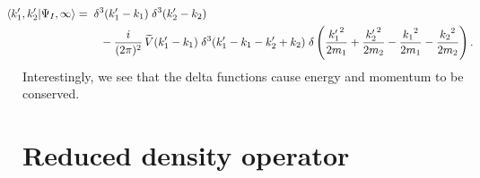 \documentclass[11pt]{article}
\newcommand{\braket}[2]{\left\langle#1|#2\right\rangle}
\theoremstyle{theorem}
\theoremstyle{remark}
\theoremstyle{step}
\theoremstyle{gap}
\begin{document}
\begin{align}
\hspace{-1.5em}\braket{k_1^\prime, k_2^\prime}{\Psi_I, \infty}
=& \;\;\delta^3(k_1^\prime - k_1)\;\delta^3(k_2^\prime - k_2) \nonumber\\&\;\;\;\;- \frac{i}{(2\pi)^2}\, \widetilde{V}(k_1^\prime-k_1) \;\delta^3(k_1^\prime-k_1-k_2^\prime+k_2) \;\delta\left(\frac{{k_1^\prime}^2}{2m_1} + \frac{{k_2^\prime}^2}{2m_2} - \frac{{k_1}^2}{2m_1} - \frac{{k_2}^2}{2m_2}\right).
\end{align}
Interestingly, we see that the delta functions cause energy and momentum to be conserved.

\section{Reduced density operator}
\end{document}
